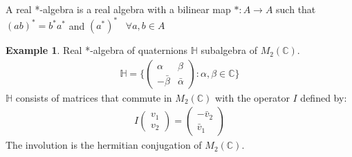 \documentclass[a4paper]{article}
\theoremstyle{definition}
\theoremstyle{definition}
\theoremstyle{definition}
\newtheorem{example}{Example}
\theoremstyle{theorem}
\theoremstyle{theorem}
\theoremstyle{theorem}
\begin{document}
A real *-algebra is a real algebra with a bilinear map $*:A \rightarrow A$
such that $(ab)^* = b^*a^*$ and $(a^*)^* \;\;\; \forall a,b\in A$
\begin{example}
    Real *-algebra of quaternions $\mathbb{H}$ subalgebra of $M_2(\mathbb{C})$.
    \begin{align}
        \mathbb{H} = \{ \begin{pmatrix}\alpha & \beta \\ -\bar{\beta} &
        \bar{\alpha}\end{pmatrix} : \alpha, \beta \in
            \mathbb{C}\}
    \end{align}
    $\mathbb{H}$ consists of matrices that commute in $M_2(\mathbb{C})$ with
    the operator $I$ defined by:
    \begin{align}
        I\begin{pmatrix}v_1 \\ v_2\end{pmatrix} = \begin{pmatrix}-\bar{v}_2 \\
    \bar{v}_1\end{pmatrix}
    \end{align}
    The involution is the hermitian conjugation of $M_2(\mathbb{C})$.
\end{example}
\end{document}
